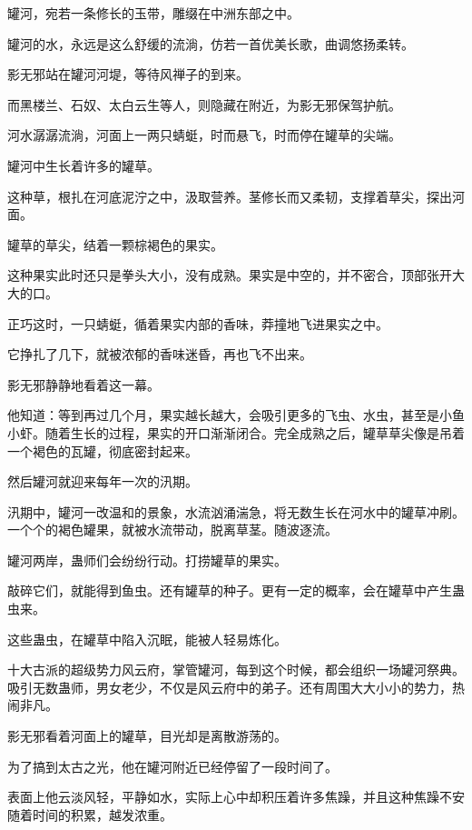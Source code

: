 
\begin{this_body}

罐河，宛若一条修长的玉带，雕缀在中洲东部之中。

罐河的水，永远是这么舒缓的流淌，仿若一首优美长歌，曲调悠扬柔转。

影无邪站在罐河河堤，等待风禅子的到来。

而黑楼兰、石奴、太白云生等人，则隐藏在附近，为影无邪保驾护航。

河水潺潺流淌，河面上一两只蜻蜓，时而悬飞，时而停在罐草的尖端。

罐河中生长着许多的罐草。

这种草，根扎在河底泥泞之中，汲取营养。茎修长而又柔韧，支撑着草尖，探出河面。

罐草的草尖，结着一颗棕褐色的果实。

这种果实此时还只是拳头大小，没有成熟。果实是中空的，并不密合，顶部张开大大的口。

正巧这时，一只蜻蜓，循着果实内部的香味，莽撞地飞进果实之中。

它挣扎了几下，就被浓郁的香味迷昏，再也飞不出来。

影无邪静静地看着这一幕。

他知道：等到再过几个月，果实越长越大，会吸引更多的飞虫、水虫，甚至是小鱼小虾。随着生长的过程，果实的开口渐渐闭合。完全成熟之后，罐草草尖像是吊着一个褐色的瓦罐，彻底密封起来。

然后罐河就迎来每年一次的汛期。

汛期中，罐河一改温和的景象，水流汹涌湍急，将无数生长在河水中的罐草冲刷。一个个的褐色罐果，就被水流带动，脱离草茎。随波逐流。

罐河两岸，蛊师们会纷纷行动。打捞罐草的果实。

敲碎它们，就能得到鱼虫。还有罐草的种子。更有一定的概率，会在罐草中产生蛊虫来。

这些蛊虫，在罐草中陷入沉眠，能被人轻易炼化。

十大古派的超级势力风云府，掌管罐河，每到这个时候，都会组织一场罐河祭典。吸引无数蛊师，男女老少，不仅是风云府中的弟子。还有周围大大小小的势力，热闹非凡。

影无邪看着河面上的罐草，目光却是离散游荡的。

为了搞到太古之光，他在罐河附近已经停留了一段时间了。

表面上他云淡风轻，平静如水，实际上心中却积压着许多焦躁，并且这种焦躁不安随着时间的积累，越发浓重。


\end{this_body}
